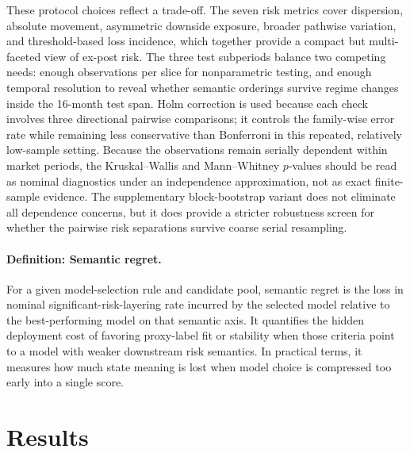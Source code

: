 \documentclass[a4paper,fleqn]{cas-dc}
\begin{document}
These protocol choices reflect a trade-off. The seven risk metrics cover dispersion, absolute movement, asymmetric downside exposure, broader pathwise variation, and threshold-based loss incidence, which together provide a compact but multi-faceted view of ex-post risk. The three test subperiods balance two competing needs: enough observations per slice for nonparametric testing, and enough temporal resolution to reveal whether semantic orderings survive regime changes inside the 16-month test span. Holm correction is used because each check involves three directional pairwise comparisons; it controls the family-wise error rate while remaining less conservative than Bonferroni in this repeated, relatively low-sample setting. Because the observations remain serially dependent within market periods, the Kruskal--Wallis and Mann--Whitney $p$-values should be read as nominal diagnostics under an independence approximation, not as exact finite-sample evidence. The supplementary block-bootstrap variant does not eliminate all dependence concerns, but it does provide a stricter robustness screen for whether the pairwise risk separations survive coarse serial resampling.

\paragraph{Definition: Semantic regret.}
For a given model-selection rule and candidate pool, semantic regret is the loss in nominal significant-risk-layering rate incurred by the selected model relative to the best-performing model on that semantic axis. It quantifies the hidden deployment cost of favoring proxy-label fit or stability when those criteria point to a model with weaker downstream risk semantics. In practical terms, it measures how much state meaning is lost when model choice is compressed too early into a single score.

\section{Results}
\end{document}
